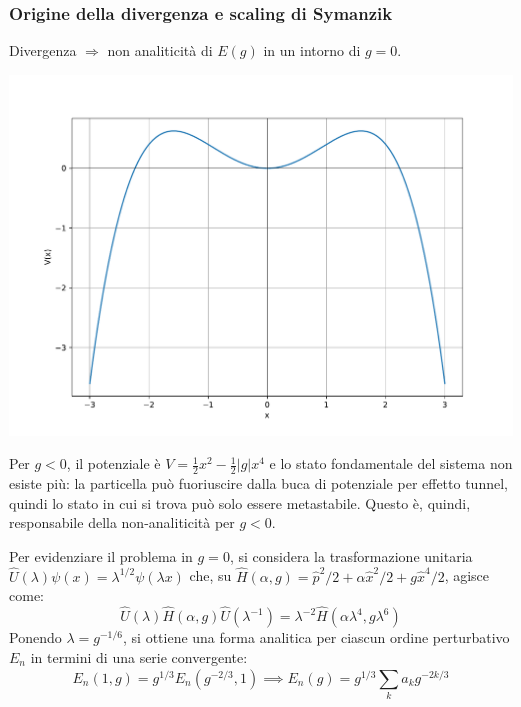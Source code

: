 \documentclass[10pt]{beamer}
\begin{document}
  \begin{frame}
\frametitle{Origine della divergenza e scaling di Symanzik}

  Divergenza $\Rightarrow $ non analiticit\`a di $E(g)$ in un intorno di $g=0$. 
  \begin{minipage}{0.45\textwidth}
    	\centering
    	\includegraphics[width=\columnwidth]{f1.pdf}
  \end{minipage}%
  \hfill
  \begin{minipage}{0.5\textwidth}
Per $g<0$, il potenziale \`e $V= \frac{1}{2}x^2 - \frac{1}{2}\lvert g \rvert x^4$ e lo stato fondamentale del sistema non esiste pi\`u: la particella pu\`o fuoriuscire dalla buca di potenziale per effetto tunnel, quindi lo stato in cui si trova pu\`o solo essere metastabile.
Questo \`e, quindi, responsabile della non-analiticit\`a per $g<0$.
  \end{minipage}
{\hspace{2cm}}
  Per evidenziare il problema in $g=0$, si considera la trasformazione unitaria $\hat{U}(\lambda ) \psi (x) = \lambda ^{1 / 2} \psi (\lambda x)$ che, su $\hat{H}(\alpha ,g) = \hat{p}^2 / 2 + \alpha  \hat{x}^2 / 2 + g \hat{x}^4 / 2$, agisce come:
  \begin{equation*}
  	\hat{U}(\lambda ) \hat{H}(\alpha ,g) \hat{U}(\lambda ^{-1} ) = \lambda ^{-2} \hat{H}(\alpha  \lambda ^4, g \lambda ^6)
  \end{equation*}
Ponendo $\lambda  = g^{- 1 / 6} $, si ottiene una forma analitica per ciascun ordine perturbativo $E_n$ in termini di una serie convergente:
  \[
  E_n(1,g) = g^{1 / 3} E_n(g^{-2 / 3} , 1) \implies E_n(g) = g^{1 /3 }  \sum_{k}^{} a_k g^{-2k/3}
\] 
  \end{frame} 
\end{document}
